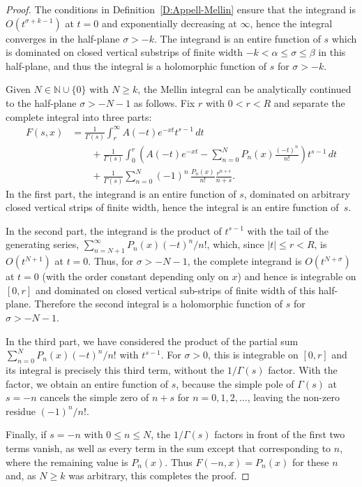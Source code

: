 \documentclass[11pt,a4paper]{amsart}
\newcommand{\N}{\mathbb{N}}
\theoremstyle{plain}
\theoremstyle{plain}
\theoremstyle{definition}
\theoremstyle{remark}
\begin{document}
\begin{proof}
The conditions in Definition~\ref{D:Appell-Mellin} ensure that the integrand is $O(t^{\sigma+k-1})$ at $t = 0$ and exponentially decreasing at $\infty$, hence the integral converges in the half-plane $\sigma > -k$. The integrand is an entire function of $s$ which is dominated on closed vertical substrips of finite width $-k < \alpha \leq \sigma \leq \beta$ in this half-plane, and thus the integral is a holomorphic function of $s$ for $\sigma > -k$.

Given $N \in \N \cup \{0\}$ with $N \geq k$, the Mellin integral can be analytically continued to the  half-plane $\sigma > -N-1$ as follows. Fix $r$ with $0 < r < R$ and separate the complete integral into three parts:
\begin{align*}
  F(s,x) &= \frac{1}{\Gamma(s)} \int_r^\infty A(-t) e^{-xt}t^{s-1}\,dt \\
  & \qquad + \frac{1}{\Gamma(s)} \int_0^{r} \left( A(-t)e^{-xt} 
  - \sum_{n=0}^N P_{n}(x)\frac{(-t)^n}{n!} \right)t^{s-1}\,dt \\
  & \qquad + \frac{1}{\Gamma(s)} \sum_{n=0}^N (-1)^n\, \frac{P_{n}(x)}{n!}\frac{r^{n+s}}{n+s}.
\end{align*}
In the first part, the integrand is an entire function of $s$, dominated on arbitrary closed vertical strips of finite width, hence the integral is an entire function of~$s$.

In the second part, the integrand is the product of $t^{s-1}$ with the tail of the generating series, $\sum_{n=N+1}^{\infty} P_{n}(x) (-t)^{n}/n!$, which, since $|t| \leq r < R$, is $O(t^{N+1})$ at $t=0$. Thus, for $\sigma > -N-1$, the complete integrand is $O(t^{N+\sigma})$ at $t=0$ (with the order constant depending only on $x$) and hence is integrable on $[0,r]$ and dominated on closed vertical sub-strips of finite width of this half-plane. Therefore the second integral is a holomorphic function of $s$ for $\sigma > -N-1$.

In the third part, we have considered the product of the partial sum $\sum_{n=0}^{N} P_{n}(x) (-t)^{n}/n!$ with $t^{s-1}$. For $\sigma > 0$, this is integrable on $[0,r]$ and its integral is precisely this third term, without the $1/\Gamma(s)$ factor. With the factor, we obtain an entire function of $s$, because the simple pole of $\Gamma(s)$ at $s = -n$ cancels the simple zero of $n+s$ for $n=0,1,2,\dots$, leaving the non-zero residue $(-1)^{n}/n!$.

Finally, if $s = -n$ with $0 \leq n \leq N$, the $1/\Gamma(s)$ factors in front of the first two terms vanish, as well as every term in the sum except that corresponding to $n$, where the remaining value is $P_{n}(x)$. Thus $F(-n,x) = P_{n}(x)$ for these $n$ and, as $N \geq k$ was arbitrary, this completes the proof.
\end{proof}
\end{document}
